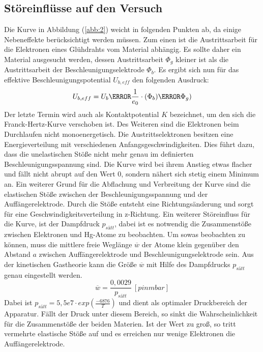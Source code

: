 \subsection{Störeinflüsse auf den Versuch}
Die Kurve in Abbildung (\ref{abb:2}) weicht in folgenden Punkten ab, da einige Nebeneffekte berücksichtigt werden müssen.
Zum einen ist die Austrittsarbeit für die Elektronen eines Glühdrahts vom Material abhängig.
Es sollte daher ein Material ausgesucht werden, dessen Austrittsarbeit $\Phi_g$ kleiner ist als die
Austrittsarbeit der Beschleunigungselektrode $\Phi_b$.
Es ergibt sich nun für das effektive Beschleunigungspotential $U_{b,eff}$ den folgenden Ausdruck:
\begin{equation}
  U_{b,eff} = U_b \m \frac{1}{e_0} \cdot (\Phi_b) \m \Phi_g)
  \label{eq:4}
\end{equation}
Der letzte Termin wird auch als Kontaktpotential $K$ bezeichnet, um den sich die Franck-Hertz-Kurve verschoben ist.
Des Weiteren sind die Elektronen beim Durchlaufen nicht monoenergetisch.
Die Austrittselektronen besitzen eine Energieverteilung mit verschiedenen Anfangsgeschwindigkeiten.
Dies führt dazu, dass die unelastischen Stöße nicht mehr genau im definierten Beschleunigungsspannung sind.
Die Kurve wird bei ihrem Anstieg etwas flacher und fällt nicht abrupt auf den Wert 0, sondern nähert sich stetig einem Minimum an.
Ein weiterer Grund für die Abflachung und Verbreitung der Kurve sind die elastischen Stöße zwischen der Beschleunigungsspannung
und der Auffängerelektrode. Durch die Stöße entsteht eine Richtungsänderung und sorgt für eine Geschwindigkeitsverteilung in
z-Richtung.
Ein weiterer Störeinfluss für die Kurve, ist der Dampfdruck $p_{sätt}$, dabei ist es notwendig die
Zusammenstöße zwischen Elektronen und Hg-Atome zu beobachten. Um sowas beobachten zu können,
muss die mittlere freie Weglänge $\overline{w}$ der Atome klein gegenüber den Abstand $a$ zwischen Auffängerelektrode und Beschleunigungselektrode
sein.
Aus der kinetischen Gastheorie kann die Größe $\overline{w}$ mit Hilfe des Dampfdrucks $p_{sätt}$
genau eingestellt werden.
\begin{equation}
  \overline{w} = \frac{0,0029}{p_{sätt}} \ [p in mbar]
  \label{eq:5}
\end{equation}
Dabei ist $p_{sätt} = 5,5e7 \cdot exp(\frac{-6876}{T})$ und dient als optimaler Druckbereich der Apparatur.
Fällt der Druck unter diesem Bereich,
so sinkt die Wahrscheinlichkeit für die Zusammenstöße der beiden Materien. Ist der Wert zu groß, so tritt
vermehrte elastische Stöße auf und es erreichen nur wenige Elektronen die Auffängerelektrode.
